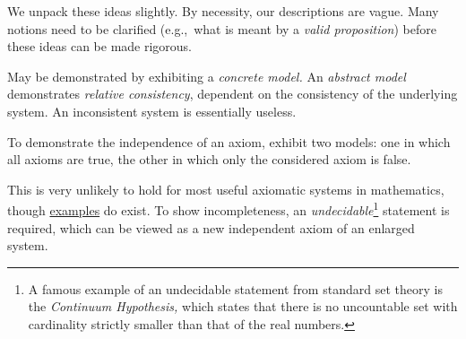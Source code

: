 We unpack these ideas slightly. By necessity, our descriptions are vague. Many notions need to be clarified (e.g.,\ what is meant by a \emph{valid proposition}) before these ideas can be made rigorous.
\begin{description}\itemsep0pt
	\item[\normalfont\emph{Consistency}] May be demonstrated by exhibiting a \emph{concrete model.} An \emph{abstract model} demonstrates \emph{relative consistency}, dependent on the consistency of the underlying system. An inconsistent system is essentially useless.
	\item[\normalfont\emph{Independence}] To demonstrate the independence of an axiom, exhibit two models: one in which all axioms are true, the other in which only the considered axiom is false. 
	\item[\normalfont\emph{Completeness}] This is very unlikely to hold for most useful axiomatic systems in mathematics, though \href{https://en.wikipedia.org/wiki/Complete_theory}{examples} do exist. To show incompleteness, an \emph{undecidable}\footnote{A famous example of an undecidable statement from standard set theory is the \emph{Continuum Hypothesis,} which states that there is no uncountable set with cardinality strictly smaller than that of the real numbers.} statement is required, which can be viewed as a new independent axiom of an enlarged system. 
	\end{description}


